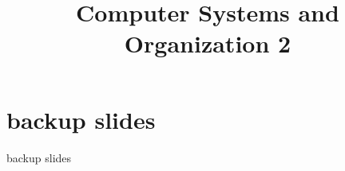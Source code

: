 \date{}
\title{Computer Systems and Organization 2}
\date{}

\begin{frame}
    \titlepage
\end{frame}







\section{backup slides}
\begin{frame}{backup slides}
\end{frame}


